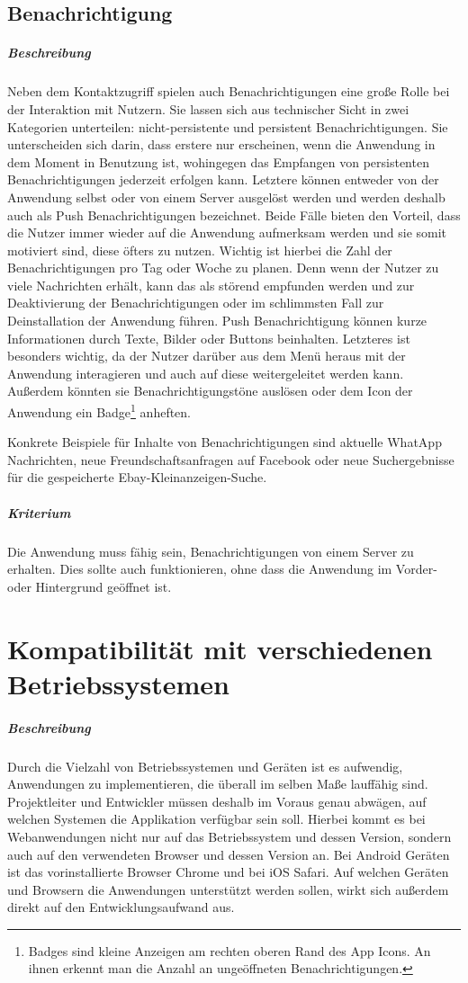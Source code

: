 \subsection{Benachrichtigung}
\subparagraph{Beschreibung\\}
Neben dem Kontaktzugriff spielen auch Benachrichtigungen eine große Rolle bei der Interaktion mit Nutzern.
Sie lassen sich aus technischer Sicht in zwei Kategorien unterteilen: nicht-persistente und persistent Benachrichtigungen.
Sie unterscheiden sich darin, dass erstere nur erscheinen, wenn die Anwendung in dem Moment in Benutzung ist, wohingegen das Empfangen von persistenten Benachrichtigungen jederzeit erfolgen kann.
Letztere können entweder von der Anwendung selbst oder von einem Server ausgelöst werden und werden deshalb auch als Push Benachrichtigungen bezeichnet.
Beide Fälle bieten den Vorteil, dass die Nutzer immer wieder auf die Anwendung aufmerksam werden und sie somit motiviert sind, diese öfters zu nutzen.
Wichtig ist hierbei die Zahl der Benachrichtigungen pro Tag oder Woche zu planen.
Denn wenn der Nutzer zu viele Nachrichten erhält, kann das als störend empfunden werden und zur Deaktivierung der Benachrichtigungen oder im schlimmsten Fall zur Deinstallation der Anwendung führen.
Push Benachrichtigung können kurze Informationen durch Texte, Bilder oder Buttons beinhalten.
Letzteres ist besonders wichtig, da der Nutzer darüber aus dem Menü heraus mit der Anwendung interagieren und auch auf diese weitergeleitet werden kann.
Außerdem könnten sie Benachrichtigungstöne auslösen oder dem Icon der Anwendung ein Badge\footnote{Badges sind kleine Anzeigen am rechten oberen Rand des App Icons. An ihnen erkennt man die Anzahl an ungeöffneten Benachrichtigungen.} anheften.

Konkrete Beispiele für Inhalte von Benachrichtigungen sind aktuelle WhatApp Nachrichten, neue Freundschaftsanfragen auf Facebook oder neue Suchergebnisse für die gespeicherte Ebay-Kleinanzeigen-Suche.

\subparagraph{Kriterium\\}
Die Anwendung muss fähig sein, Benachrichtigungen von einem Server zu erhalten.
Dies sollte auch funktionieren, ohne dass die Anwendung im Vorder- oder Hintergrund geöffnet ist.

\section{Kompatibilität mit verschiedenen Betriebssystemen}
\subparagraph{Beschreibung\\}
Durch die Vielzahl von Betriebssystemen und Geräten ist es aufwendig, Anwendungen zu implementieren, die überall im selben Maße lauffähig sind.
Projektleiter und Entwickler müssen deshalb im Voraus genau abwägen, auf welchen Systemen die Applikation verfügbar sein soll.
Hierbei kommt es bei Webanwendungen nicht nur auf das Betriebssystem und dessen Version, sondern auch auf den verwendeten Browser und dessen Version an.
Bei Android Geräten ist das vorinstallierte Browser Chrome und bei iOS Safari.
Auf welchen Geräten und Browsern die Anwendungen unterstützt werden sollen, wirkt sich außerdem direkt auf den Entwicklungsaufwand aus.

